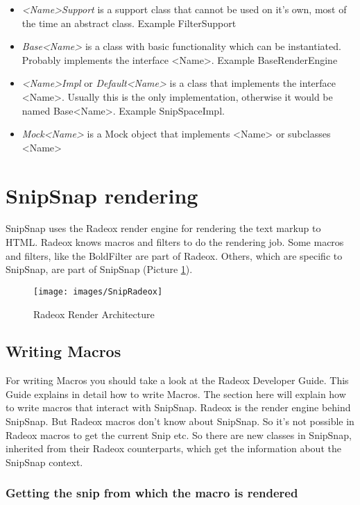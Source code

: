 \documentclass[a4paper,pdftex]{article}
\begin{document}
\begin{itemize}
\item \textit{<Name>Support} is a support class that cannot be used on it's own, most of the time an abstract class. Example FilterSupport
\item \textit{Base<Name>} is a class with basic functionality which can be instantiated. Probably implements the interface <Name>. Example BaseRenderEngine
\item \textit{<Name>Impl} or \textit{Default<Name>} is a class that implements the interface <Name>. Usually this is the only implementation, otherwise it would be named Base<Name>. Example SnipSpaceImpl.
\item \textit{Mock<Name>} is a Mock object that implements <Name> or subclasses <Name>
\end{itemize}

\section{SnipSnap rendering}

SnipSnap uses the Radeox\cite{Radeox} render engine for rendering the text markup to HTML.
Radeox knows macros and filters to do the rendering job. Some macros and filters, like the BoldFilter
are part of Radeox. Others, which are specific to SnipSnap, are part of SnipSnap (Picture \ref{Architecture}).

\begin{figure}[ht]
  \centering
    \texttt{[image: images/SnipRadeox]}
     \caption{\small\textsf Radeox Render Architecture}
     \label{Architecture}
\end{figure}

\subsection{Writing Macros}

For writing  Macros you should take a look at the Radeox Developer Guide. This Guide explains in 
detail how to write Macros. The section here will explain how to write macros that interact with
SnipSnap. Radeox is the render engine behind SnipSnap. But Radeox macros don't know about SnipSnap. 
So it's not possible in Radeox macros to get the current Snip etc. So there are new classes in SnipSnap,
inherited from their Radeox counterparts, which get the information about the SnipSnap context.

\subsubsection{Getting the snip from which the macro is rendered}
\end{document}
